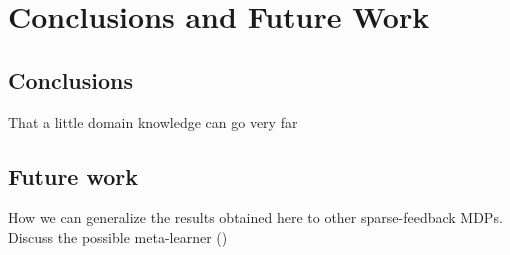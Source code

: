 \chapter{Conclusions and Future Work}
  \section{Conclusions}
  That a little domain knowledge can go very far
  \section{Future work}
  How we can generalize the results obtained here to other sparse-feedback MDPs.
  Discuss the possible meta-learner (\cite[Section~9.2]{sutton1998introduction})

